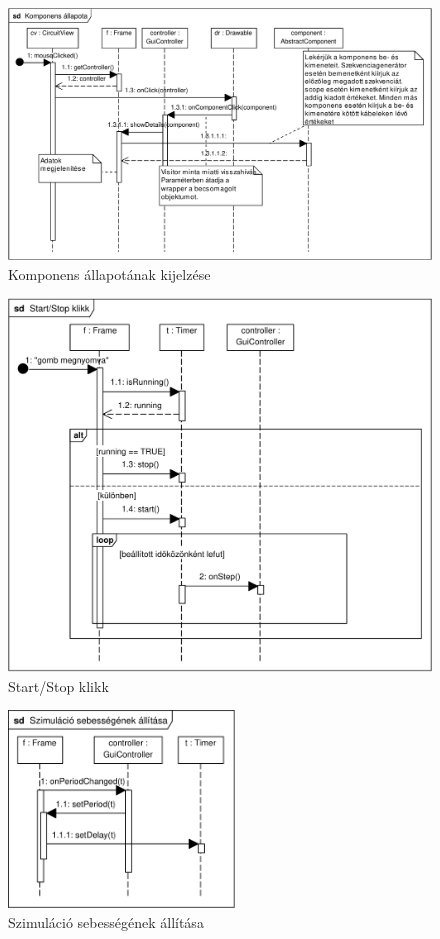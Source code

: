 \begin{figure}[h]
\begin{center}
\includegraphics[width=17cm]{chapters/chapter11/pdfs/10_showcomponent.pdf}
\caption{Komponens állapotának kijelzése}
\label{fig:showcomponent}
\end{center}
\end{figure}

\begin{figure}[h]
\begin{center}
\includegraphics[width=17cm]{chapters/chapter11/pdfs/11_startstop.pdf}
\caption{Start/Stop klikk}
\label{fig:startstop}
\end{center}
\end{figure}

\begin{figure}[h]
\begin{center}
\includegraphics[width=6cm]{chapters/chapter11/pdfs/12_szimseb.pdf}
\caption{Szimuláció sebességének állítása}
\label{fig:szimseb}
\end{center}
\end{figure}